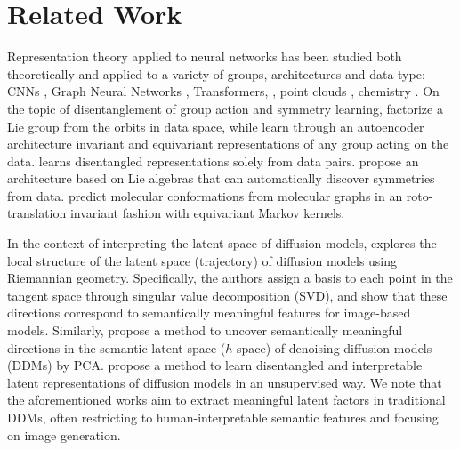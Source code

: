 \section{Related Work}
Representation theory applied to neural networks has been studied both theoretically \citep{esteves2020theoretical, chughtai2023toy, puny2021frame, smidt2021euclidean} and applied to a variety of groups, architectures and data type: CNNs \citep{cohen2016group, romero2020attentive, liao2023lie, finzi2020generalizing,  weiler2019general, weiler20183d}, Graph Neural Networks \citep{satorras2021n}, Transformers,  \citep{geiger2022e3nn, romero2020group, hutchinson2021lietransformer}, point clouds \citep{thomas2018tensor}, 
chemistry \citep{schutt2021equivariant, le2022equivariant}.
On the topic of disentanglement of group action and symmetry learning, \citet{pfau2020disentangling} factorize a Lie group from the orbits in data space,
while \citet{winter2022unsupervised} learn through an autoencoder architecture invariant and equivariant representations of any group acting on the data. 
\citet{fumero2021learning} learns disentangled representations solely from data pairs.
\citet{dehmamy2021automatic} propose an architecture based on Lie algebras that can automatically discover symmetries from data.
\citet{xu2022geodiff} predict molecular conformations from molecular graphs
in an roto-translation invariant fashion with equivariant Markov kernels.

In the context of interpreting the latent space of diffusion models, \citet{park2023understanding} explores the local structure of the latent space (trajectory) of diffusion models using Riemannian geometry. Specifically, the authors assign a basis to each point in the tangent space through singular value decomposition (SVD), and show that these directions correspond to semantically meaningful features for image-based models. 
Similarly, \citet{haas2024discovering} propose a method to uncover semantically meaningful directions in the semantic latent space ($h$-space) \citep{wang2023infodiffusion} of denoising diffusion models (DDMs) by PCA. \citet{wang2023infodiffusion} propose a method to  learn disentangled and interpretable latent representations of diffusion models in an unsupervised way. 
We note that the aforementioned works aim to extract meaningful latent factors \cite{bertolini2023explaining, bertolini2024enhancing} in traditional DDMs, often restricting to human-interpretable semantic features and focusing on image generation.

